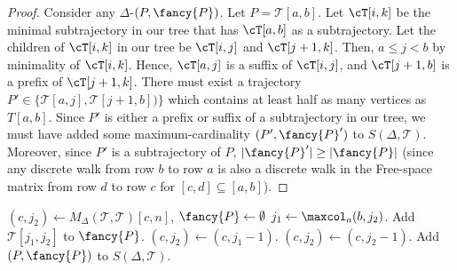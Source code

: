 \begin{proof} 
    Consider any $\Delta$-\pathlet $(P, {\fancy{P}})$.
    Let $P = \mathcal{T}[a, b]$.
    Let $\cT[i, k]$ be the minimal subtrajectory in our tree that has $\cT[a, b]$ as a subtrajectory.
    Let the children of $\cT[i, k]$ in our tree be $\cT[i, j]$ and $\cT[j+1, k]$. Then, $a \le j < b$ by minimality of $\cT[i, k]$.
    Hence, $\cT[a, j]$ is a suffix of $\cT[i, j]$, and $\cT[j+1, b]$ is a prefix of $\cT[j+1, k]$.
    There must exist a trajectory $P' \in \{ \mathcal{T}[a, j],  \mathcal{T}[j+1, b]) \}$ which contains at least half as many vertices as $T[a, b]$.
    Since $P'$ is either a prefix or suffix of a subtrajectory in our tree, we must have added some maximum-cardinality \pathlet $(P', {\fancy{P}}')$ to $S(\Delta, \mathcal{T})$.
    Moreover, since $P'$ is a subtrajectory of $P$, $|{\fancy{P}}'| \geq | {\fancy{P}}|$ (since any discrete walk from row $b$ to row $a$ is also a discrete walk in the Free-space matrix from row $d$ to row $c$ for $[c, d] \subseteq [a, b]$).
\end{proof}
%
%
 \begin{algorithm}[h]
    \caption{Query($P = \mathcal{T}[a, c]$, $\Delta$, $\mathcal{T}, S(\Delta, \mathcal{T}))$}
    \label{alg:query_fast}
    \begin{algorithmic}
    \State $(c, j_2) \gets M_\Delta(\mathcal{T}, \mathcal{T})[c, n]$, ${\fancy{P}} \gets \emptyset$ 
    \State $j_1 \gets \maxcol_a(b, j_2)$.
    \State Add    
    $\mathcal{T}[j_1, j_2]$ to  ${\fancy{P}}$.
    \State $(c, j_2) \gets (c, j_1 - 1)$.
    \Else 
    \State $(c, j_2) \gets (c, j_2 - 1)$. 
    \EndIf
    \EndWhile
    \State Add $(P, {\fancy{P}})$ to $S(\Delta, \mathcal{T})$.
    \end{algorithmic}
  \end{algorithm}
